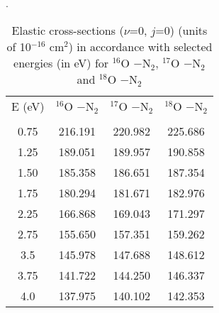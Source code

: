 \documentclass[fleqn,usenatbib]{mnras}
\begin{document}

\begin{table} %
\caption{\label{tab:table3}Elastic cross-sections ($\nu$=0, $j$=0) (units of 10$^{-16}$ cm$^2$) in accordance with selected energies (in eV) for $^{16}$O $-$N$_2$, $^{17}$O $-$N$_2$ and $^{18}$O $-$N$_2$}.
\centering
\begin{tabular}{cccc}
\cline{1-4}\\
E (eV)  & $^{16}$O $-$N$_2$ & $^{17}$O $-$N$_2$ & $^{18}$O $-$N$_2$ \\ \cline{1-4} \\
0.75    &    216.191    &    220.982  & 225.686    \\
1.25    &    189.051      &    189.957  & 190.858  \\
1.50    &    185.358      &    186.651   & 187.354  \\
1.75    &    180.294       &    181.671  & 182.976  \\
2.25    &    166.868       &    169.043  & 171.297   \\
2.75   &    155.650      &    157.351  & 159.262   \\
3.5 &    145.978       &    147.688 &  148.612  \\
3.75 &    141.722     &      144.250  & 146.337  \\
4.0 &    137.975     &      140.102  &  142.353 \\
\cline{1-4}          
\end{tabular}
\end{table}


\end{document}
